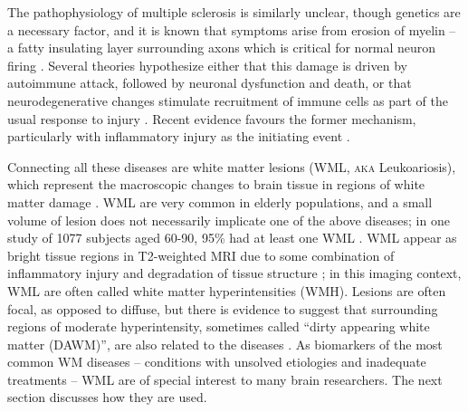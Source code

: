 \par
The pathophysiology of multiple sclerosis is similarly unclear, though genetics are a necessary factor, and it is known that symptoms arise from erosion of myelin -- a fatty insulating layer surrounding axons which is critical for normal neuron firing \cite{Trapp2008}.
Several theories hypothesize either that this damage is driven by autoimmune attack, followed by neuronal dysfunction and death, or that neurodegenerative changes stimulate recruitment of immune cells as part of the usual response to injury \cite{Lucchinetti2000,Trapp2008}.
Recent evidence favours the former mechanism, particularly with inflammatory injury as the initiating event \cite{Ciccarelli2014,Mahad2015}.
\par
Connecting all these diseases are white matter lesions (WML, \textsc{aka} Leukoariosis), which represent the macroscopic changes to brain tissue in regions of white matter damage \cite{Debette2010,Bakshi2005,Wardlaw2015}.
WML are very common in elderly populations, and a small volume of lesion does not necessarily implicate one of the above diseases; in one study of 1077 subjects aged 60-90, 95\% had at least one WML \cite{DeLeeuw2001}.
WML appear as bright tissue regions in T2-weighted MRI due to some combination of inflammatory injury and degradation of tissue structure \cite{Bakshi2005,Wardlaw2015}; in this imaging context, WML are often called white matter hyperintensities (WMH).
Lesions are often focal, as opposed to diffuse, but there is evidence to suggest that surrounding regions of moderate hyperintensity, sometimes called ``dirty appearing white matter (DAWM)'', are also related to the diseases \cite{Ge2003}.
As biomarkers of the most common WM diseases -- conditions with unsolved etiologies and inadequate treatments -- WML are of special interest to many brain researchers.
The next section discusses how they are used.
